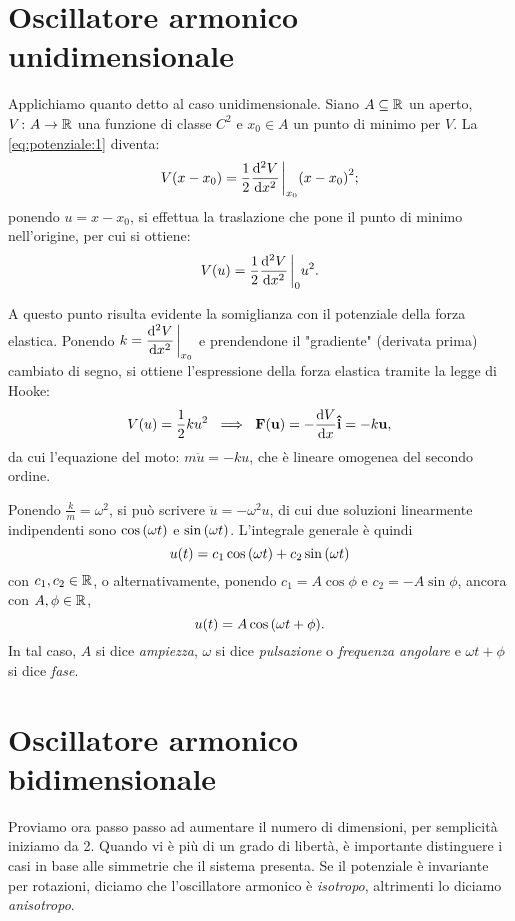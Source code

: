 \section{Oscillatore armonico unidimensionale}
    Applichiamo quanto detto al caso unidimensionale. Siano $A\subseteq\mathbb{R}$ un aperto, $V\colon A\rightarrow\mathbb{R}$ una funzione di classe $C^2$ e $x_0\in A$ un punto di minimo per $V$. La \eqref{eq:potenziale:1} diventa:
        $$V(x-x_0)=\frac{1}{2}\dv[2]{V}{x}\eval_{x_0}\qty(x-x_0)^2;$$
    ponendo $u=x-x_0$, si effettua la traslazione che pone il punto di minimo nell'origine, per cui si ottiene:
        $$V(u)=\frac{1}{2}\dv[2]{V}{x}\eval_{0}u^2.$$
    \par A questo punto risulta evidente la somiglianza con il potenziale della forza elastica. Ponendo $\displaystyle k=\dv[2]{V}{x}\eval_{x_0}$ e prendendone il "gradiente" (derivata prima) cambiato di segno, si ottiene l'espressione della forza elastica tramite la legge di Hooke:
        $$V\qty(u)=\frac{1}{2}ku^2\ \implies\ \vb{F\qty(\vb{u})}=-\dv{V}{x}\vu{i}=-k\vb{u},$$
    da cui l'equazione del moto: $m\ddot{u}=-ku$, che \`e lineare omogenea del secondo ordine.
    \par Ponendo $\frac{k}{m}=\omega^2$, si pu\`o scrivere $\ddot{u}=-\omega^2u$, di cui due soluzioni linearmente indipendenti sono $\cos\qty(\omega t)$ e $\sin\qty(\omega t)$. L'integrale generale \`e quindi $$u\qty(t)=c_1\cos\qty(\omega t)+c_2\sin\qty(\omega t)$$ con $c_1,c_2\in\mathbb{R}$, o alternativamente, ponendo $c_1=A\cos\phi$ e $c_2=-A\sin\phi$, ancora con $A,\phi\in\mathbb{R}$,
        $$u\qty(t)=A\cos\qty(\omega t+\phi).$$
    In tal caso, $A$ si dice \emph{ampiezza}, $\omega$ si dice \emph{pulsazione} o \emph{frequenza angolare} e $\omega t+\phi$ si dice \emph{fase}.
\section{Oscillatore armonico bidimensionale}
    Proviamo ora passo passo ad aumentare il numero di dimensioni, per semplicit\`a iniziamo da 2. Quando vi \`e pi\`u di un grado di libert\`a, \`e importante distinguere i casi in base alle simmetrie che il sistema presenta. Se il potenziale \`e invariante per rotazioni, diciamo che l'oscillatore armonico \`e \emph{isotropo}, altrimenti lo diciamo \emph{anisotropo}.
